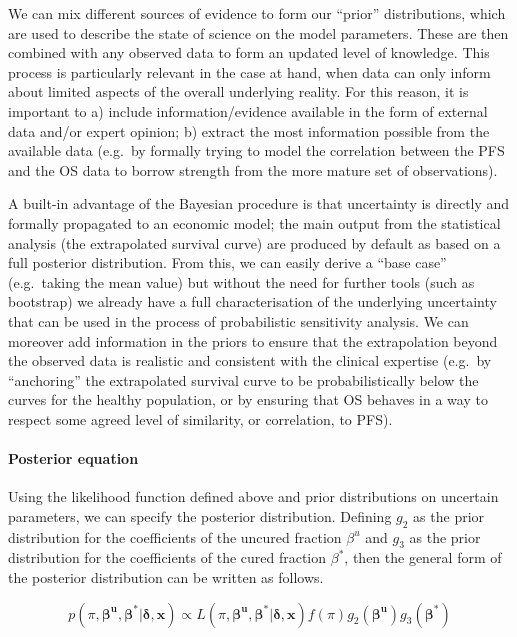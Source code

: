 \documentclass[
]{article}
\begin{document}
We can mix different sources of evidence to form our ``prior''
distributions, which are used to describe the state of science on the
model parameters. These are then combined with any observed data to form
an updated level of knowledge. This process is particularly relevant in
the case at hand, when data can only inform about limited aspects of the
overall underlying reality. For this reason, it is important to a)
include information/evidence available in the form of external data
and/or expert opinion; b) extract the most information possible from the
available data (e.g.~by formally trying to model the correlation between
the PFS and the OS data to borrow strength from the more mature set of
observations).

A built-in advantage of the Bayesian procedure is that uncertainty is
directly and formally propagated to an economic model; the main output
from the statistical analysis (the extrapolated survival curve) are
produced by default as based on a full posterior distribution. From
this, we can easily derive a ``base case'' (e.g.~taking the mean value)
but without the need for further tools (such as bootstrap) we already
have a full characterisation of the underlying uncertainty that can be
used in the process of probabilistic sensitivity analysis. We can
moreover add information in the priors to ensure that the extrapolation
beyond the observed data is realistic and consistent with the clinical
expertise (e.g.~by ``anchoring'' the extrapolated survival curve to be
probabilistically below the curves for the healthy population, or by
ensuring that OS behaves in a way to respect some agreed level of
similarity, or correlation, to PFS).

\hypertarget{posterior-equation}{%
\paragraph{Posterior equation}\label{posterior-equation}}

Using the likelihood function defined above and prior distributions on
uncertain parameters, we can specify the posterior distribution.
Defining \(g_2\) as the prior distribution for the coefficients of the
uncured fraction \(\beta^u\) and \(g_3\) as the prior distribution for
the coefficients of the cured fraction \(\beta^*\), then the general
form of the posterior distribution can be written as follows.

\[
p(\pi, \boldsymbol{\beta^u}, \boldsymbol{\beta^*} | \boldsymbol{\delta}, \boldsymbol{x}) \propto L(\pi, \boldsymbol{\beta^u}, \boldsymbol{\beta^*} | \boldsymbol{\delta}, \boldsymbol{x}) f(\pi) g_2(\boldsymbol{\beta^u}) g_3(\boldsymbol{\beta^*})
\]
\end{document}
